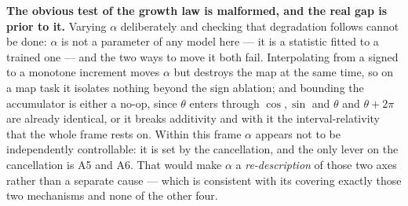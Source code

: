 \documentclass[11pt]{article}
\begin{document}
\begin{itemize}
  \textbf{The obvious test of the growth law is malformed, and the real gap is
  prior to it.} Varying $\alpha$ deliberately and checking that degradation follows
  cannot be done: $\alpha$ is not a parameter of any model here --- it is a
  statistic fitted to a trained one --- and the two ways to move it both fail.
  Interpolating
  from a signed to a monotone increment moves $\alpha$ but destroys the map at the
  same time, so on a map task it isolates nothing beyond the sign ablation; and
  bounding the accumulator is either a no-op, since $\theta$ enters through
  $\cos,\sin$ and $\theta$ and $\theta+2\pi$ are already identical, or it breaks
  additivity and with it the interval-relativity that the whole frame rests on.
  Within this frame $\alpha$ appears not to be independently controllable: it is
  set by the cancellation, and the only lever on the cancellation is A5 and A6.
  That would make $\alpha$ a \emph{re-description} of those two axes rather than a
  separate cause --- which is consistent with its covering exactly those two
  mechanisms and none of the other four.


\end{itemize}
\end{document}
